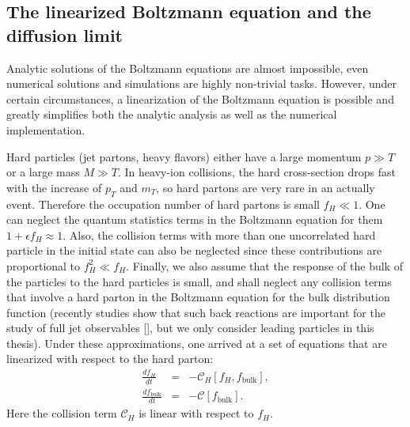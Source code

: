 \subsection{The linearized Boltzmann equation and the diffusion limit}
Analytic solutions of the Boltzmann equations are almost impossible, even numerical solutions and simulations are highly non-trivial tasks.
However, under certain circumstances, a linearization of the Boltzmann equation is possible and greatly simplifies both the analytic analysis as well as the numerical implementation.

Hard particles (jet partons, heavy flavors) either have a large momentum $p\gg T$ or a large mass $M \gg T$. 
In heavy-ion collisions, the hard cross-section drops fast with the increase of $p_T$ and $m_T$, so hard partons are very rare in an actually event. 
Therefore the occupation number of hard partons is small $f_H \ll 1$.
One can neglect the quantum statistics terms in the Boltzmann equation for them $1+\epsilon f_H \approx 1$.
Also, the collision terms with more than one uncorrelated hard particle in the initial state can also be neglected since these contributions are proportional to $f_H^2 \ll f_H$. 
Finally, we also assume that the response of the bulk of the particles to the hard particles is small, and shall neglect any collision terms that involve a hard parton in the Boltzmann equation for the bulk distribution function (recently studies show that such back reactions are important for the study of full jet observables [], but we only consider leading particles in this thesis).
Under these approximations, one arrived at a set of equations that are linearized with respect to the hard parton:
\begin{eqnarray}
\frac{df_H}{dt} &=& -\mathcal{C}_H[f_H, f_{\textrm{bulk}}], \label{eq:hard-bulk-eq}\\
\frac{df_{\textrm{bulk}}}{dt} &=& -\mathcal{C}[f_{\textrm{bulk}}].
\end{eqnarray}
Here the collision term $\mathcal{C}_H$ is linear with respect to $f_H$.

